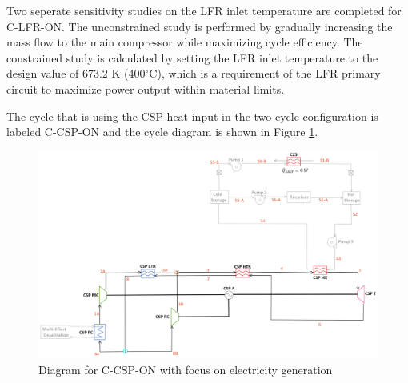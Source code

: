 \begin{paracol}{2}
\linenumbers
\switchcolumn

Two seperate sensitivity studies on the LFR inlet temperature are completed for C-LFR-ON. The unconstrained study is performed by gradually increasing the mass flow to the main compressor while maximizing cycle efficiency. The constrained study is calculated by setting the LFR inlet temperature to the design value of 673.2 K (400$^{\circ}$C), which is a requirement of the LFR primary circuit to maximize power output within material limits.

The cycle that is using the CSP heat input in the two-cycle configuration is labeled C-CSP-ON and the cycle diagram is shown in Figure \ref{c-csp-on}. 

\end{paracol}
\begin{figure}[H] 
    \widefigure
    \includegraphics[width=\linewidth]{Definitions/c-csp-on.pdf}
    \caption{Diagram for C-CSP-ON with focus on electricity generation\label{c-csp-on}}
\end{figure}

